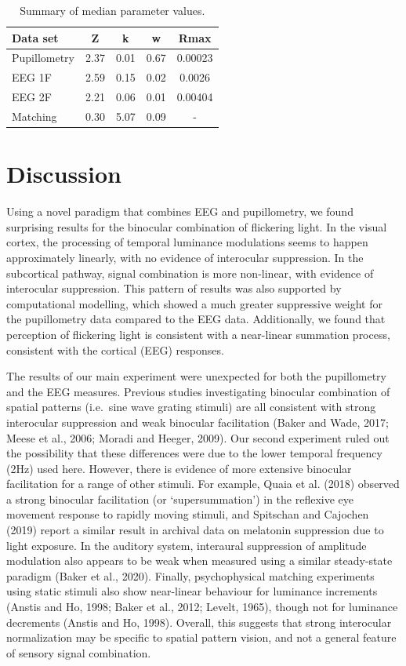 \documentclass[
]{article}
\begin{document}
\begin{table}

\caption{\label{tab:paramtable}Summary of median parameter values.}
\centering
\begin{tabular}[t]{l|c|c|c|c}
\hline
Data set & Z & k & w & Rmax\\
\hline
Pupillometry & 2.37 & 0.01 & 0.67 & 0.00023\\
\hline
EEG 1F & 2.59 & 0.15 & 0.02 & 0.0026\\
\hline
EEG 2F & 2.21 & 0.06 & 0.01 & 0.00404\\
\hline
Matching & 0.30 & 5.07 & 0.09 & -\\
\hline
\end{tabular}
\end{table}

\hypertarget{discussion}{%
\section{Discussion}\label{discussion}}

Using a novel paradigm that combines EEG and pupillometry, we found surprising results for the binocular combination of flickering light. In the visual cortex, the processing of temporal luminance modulations seems to happen approximately linearly, with no evidence of interocular suppression. In the subcortical pathway, signal combination is more non-linear, with evidence of interocular suppression. This pattern of results was also supported by computational modelling, which showed a much greater suppressive weight for the pupillometry data compared to the EEG data. Additionally, we found that perception of flickering light is consistent with a near-linear summation process, consistent with the cortical (EEG) responses.

The results of our main experiment were unexpected for both the pupillometry and the EEG measures. Previous studies investigating binocular combination of spatial patterns (i.e.~sine wave grating stimuli) are all consistent with strong interocular suppression and weak binocular facilitation (Baker and Wade, 2017; Meese et al., 2006; Moradi and Heeger, 2009). Our second experiment ruled out the possibility that these differences were due to the lower temporal frequency (2Hz) used here. However, there is evidence of more extensive binocular facilitation for a range of other stimuli. For example, Quaia et al. (2018) observed a strong binocular facilitation (or `supersummation') in the reflexive eye movement response to rapidly moving stimuli, and Spitschan and Cajochen (2019) report a similar result in archival data on melatonin suppression due to light exposure. In the auditory system, interaural suppression of amplitude modulation also appears to be weak when measured using a similar steady-state paradigm (Baker et al., 2020). Finally, psychophysical matching experiments using static stimuli also show near-linear behaviour for luminance increments (Anstis and Ho, 1998; Baker et al., 2012; Levelt, 1965), though not for luminance decrements (Anstis and Ho, 1998). Overall, this suggests that strong interocular normalization may be specific to spatial pattern vision, and not a general feature of sensory signal combination.
\end{document}
